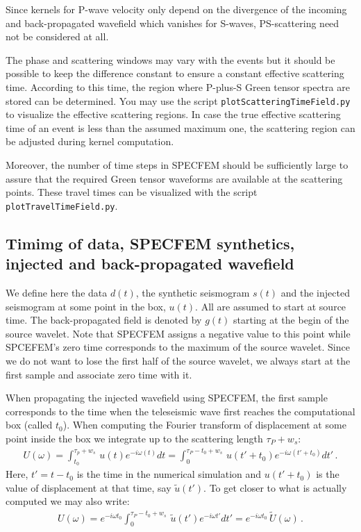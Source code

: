 Since kernels for P-wave velocity only depend on the divergence of the incoming and back-propagated wavefield which vanishes for S-waves, PS-scattering need not be considered at all.

The phase and scattering windows may vary with the events but it should be possible to keep the difference constant to ensure a constant effective scattering time. According to this time, the region where P-plus-S Green tensor spectra are stored can be determined. You may use the script \verb+plotScatteringTimeField.py+ to visualize the effective scattering regions. In case the true effective scattering time of an event is less than the assumed maximum one, the scattering region can be adjusted during kernel computation. 

Moreover, the number of time steps in SPECFEM should be sufficiently large to assure that the required Green tensor waveforms are available at the scattering points. These travel times can be visualized with the script \verb+plotTravelTimeField.py+. 
%
\subsection{Timimg of data, SPECFEM synthetics, injected and back-propagated wavefield}
%
We define here the data $d(t)$, the synthetic seismogram $s(t)$ and the injected seismogram at some point in the box, $u(t)$. All are assumed to start at source time. The back-propagated field is denoted by $g(t)$ starting at the begin of the source wavelet. Note that SPECFEM assigns a negative value to this point while SPCEFEM's zero time corresponds to the maximum of the source wavelet. Since we do not want to lose the first half of the source wavelet, we always start at the first sample and associate zero time with it.

When propagating the injected wavefield using SPECFEM, the first sample corresponds to the time when the teleseismic wave first reaches the computational box (called $t_0$). When computing the Fourier transform of displacement at some point inside the box we integrate up to the scattering length $\tau_P+w_s$:
\begin{align}
	U(\omega) = \int_{t_0}^{\tau_p+w_s}\,u(t)e^{-i\omega (t)} dt =  \int_{0}^{\tau_P-t_0+w_s}\,u(t'+t_0)e^{-i\omega (t'+t_0)} dt' \,.
\end{align}
Here, $t'=t-t_0$ is the time in the numerical simulation and $u(t'+t_0)$ is the value of displacement at that time, say $\tilde{u}(t')$. To get closer to what is actually computed we may also write:
\begin{align}
	U(\omega) = e^{-i\omega t_0}\int_{0}^{\tau_P-t_0+w_s}\,\tilde{u}(t')e^{-i\omega t'} dt' = e^{-i\omega t_0}\,\tilde{U}(\omega) \,.
\end{align}

